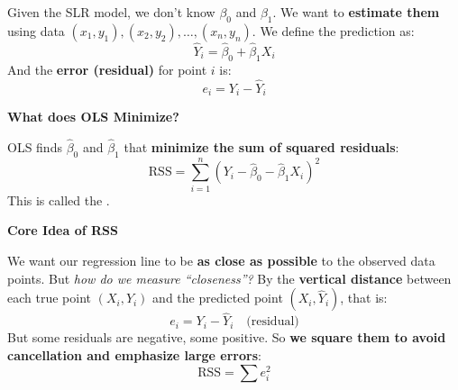 \highspace
Given the SLR model, we don't know $\beta_{0}$ and $\beta_{1}$. We want to \textbf{estimate them} using data $\left(x_{1}, y_{1}\right), \left(x_{2}, y_{2}\right), \dots, \left(x_{n}, y_{n}\right)$. We define the prediction as:
\begin{equation*}
    \hat{Y}_i = \hat{\beta}_0 + \hat{\beta}_1 X_i
\end{equation*}
And the \textbf{error (residual)} for point $i$ is:
\begin{equation}
    e_i = Y_i - \hat{Y}_i
\end{equation}

\highspace
\begin{flushleft}
    \textcolor{Green3}{ \textbf{What does OLS Minimize?}}
\end{flushleft}
OLS finds $\hat{\beta}_0$ and $\hat{\beta}_1$ that \textbf{minimize the sum of squared residuals}:
\begin{equation}\label{eq: RSS}
    \text{RSS} = \displaystyle\sum_{i=1}^{n} (Y_i - \hat{\beta}_0 - \hat{\beta}_1 X_i)^2
\end{equation}
This is called the . 

\highspace
\begin{flushleft}
    \textcolor{Green3}{ \textbf{Core Idea of RSS}}
\end{flushleft}
We want our regression line to be \textbf{as close as possible} to the observed data points. But \emph{how do we measure ``closeness''?} By the \textbf{vertical distance} between each true point $\left(X_{i}, Y_{i}\right)$ and the predicted point $(X_{i}, \hat{Y}_{i})$, that is:
\begin{equation*}
    e_i = Y_i - \hat{Y}_i \quad \text{(residual)}
\end{equation*}
But some residuals are negative, some positive. So \textbf{we square them to avoid cancellation and emphasize large errors}:
\begin{equation*}
    \text{RSS} = \displaystyle\sum e_{i}^{2}
\end{equation*}

